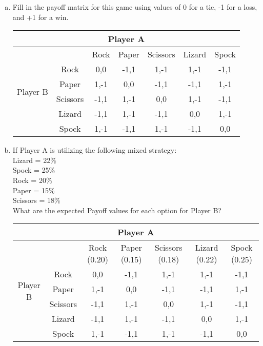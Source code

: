 \documentclass{math}
\begin{document}
\begin{enumerate}[(a)]
  \item Fill in the payoff matrix for this game using values of 0 for a tie,
  -1 for a loss, and +1 for a win.
  \begin{center}
    \begin{tabular}{|c|c|c|c|c|c|c|}
      \hline
      \multicolumn{7}{|c|}{Player A} \\ \hline
      \multirow{6}{*}{Player B}
      & & Rock & Paper & Scissors & Lizard & Spock \\ \cline{2-7}
      & Rock & 0,0 & -1,1 & 1,-1 & 1,-1 & -1,1 \\ \cline{2-7}
      & Paper & 1,-1 & 0,0 & -1,1 & -1,1 & 1,-1 \\ \cline{2-7}
      & Scissors & -1,1 & 1,-1 & 0,0 & 1,-1 & -1,1 \\ \cline{2-7}
      & Lizard & -1,1 & 1,-1 & -1,1 & 0,0 & 1,-1 \\ \cline{2-7}
      & Spock & 1,-1 & -1,1 & 1,-1 & -1,1 & 0,0 \\ \hline
    \end{tabular}
  \end{center}
  \item If Player A is utilizing the following mixed strategy: \\
  Lizard = 22\% \\
  Spock = 25\% \\
  Rock = 20\% \\
  Paper = 15\% \\
  Scissors = 18\% \\
  What are the expected Payoff values for each option for Player B?
  \begin{center}
    \begin{tabular}{|c|c|c|c|c|c|c|}
      \hline
      \multicolumn{7}{|c|}{Player A} \\ \hline
      \multirow{6}{*}{Player B}
      & & Rock (0.20) & Paper (0.15) & Scissors (0.18) & Lizard (0.22) &
        Spock (0.25) \\ \cline{2-7}
      & Rock & 0,0 & -1,1 & 1,-1 & 1,-1 & -1,1 \\ \cline{2-7}
      & Paper & 1,-1 & 0,0 & -1,1 & -1,1 & 1,-1 \\ \cline{2-7}
      & Scissors & -1,1 & 1,-1 & 0,0 & 1,-1 & -1,1 \\ \cline{2-7}
      & Lizard & -1,1 & 1,-1 & -1,1 & 0,0 & 1,-1 \\ \cline{2-7}
      & Spock & 1,-1 & -1,1 & 1,-1 & -1,1 & 0,0 \\ \hline

\end{tabular}
\end{center}
\end{enumerate}
\end{document}
